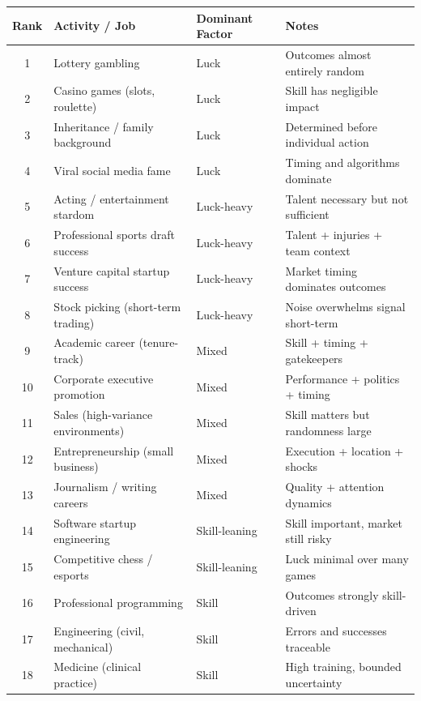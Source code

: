   \begin{table}[H]
    \centering
    \small
    \begin{tabular}{clll}
      \toprule
      \textbf{Rank} & \textbf{Activity / Job} & \textbf{Dominant Factor} & \textbf{Notes} \\
      \midrule
      1 & Lottery gambling & Luck & Outcomes almost entirely random \\
      2 & Casino games (slots, roulette) & Luck & Skill has negligible impact \\
      3 & Inheritance / family background & Luck & Determined before individual action \\
      4 & Viral social media fame & Luck & Timing and algorithms dominate \\
      5 & Acting / entertainment stardom & Luck-heavy & Talent necessary but not sufficient \\
      6 & Professional sports draft success & Luck-heavy & Talent + injuries + team context \\
      7 & Venture capital startup success & Luck-heavy & Market timing dominates outcomes \\
      8 & Stock picking (short-term trading) & Luck-heavy & Noise overwhelms signal short-term \\
      9 & Academic career (tenure-track) & Mixed & Skill + timing + gatekeepers \\
      10 & Corporate executive promotion & Mixed & Performance + politics + timing \\
      11 & Sales (high-variance environments) & Mixed & Skill matters but randomness large \\
      12 & Entrepreneurship (small business) & Mixed & Execution + location + shocks \\
      13 & Journalism / writing careers & Mixed & Quality + attention dynamics \\
      14 & Software startup engineering & Skill-leaning & Skill important, market still risky \\
      15 & Competitive chess / esports & Skill-leaning & Luck minimal over many games \\
      16 & Professional programming & Skill & Outcomes strongly skill-driven \\
      17 & Engineering (civil, mechanical) & Skill & Errors and successes traceable \\
      18 & Medicine (clinical practice) & Skill & High training, bounded uncertainty \\

\end{tabular}
\end{table}
